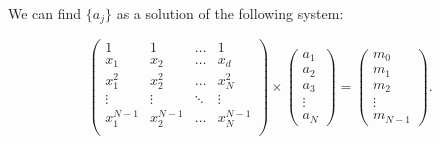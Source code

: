 We can find $\{a_j\}$ as a solution of the following system:

$$
  \begin{pmatrix}
    1 & 1 & \ldots & 1 \\
    x_1 & x_2 & \ldots & x_d \\
    x_1^2 & x_2^2 & \ldots & x_N^2 \\
    \vdots & \vdots & \ddots & \vdots \\
    x_1^{N-1} & x_2^{N-1} & \ldots & x_N^{N-1} \\
  \end{pmatrix}
  \times
  \begin{pmatrix}
    a_1 \\ a_2 \\ a_3\\ \vdots \\ a_N
  \end{pmatrix}
  =
  \begin{pmatrix}
    m_0 \\ m_1 \\ m_2 \\ \vdots \\ m_{N-1}
  \end{pmatrix}.
$$